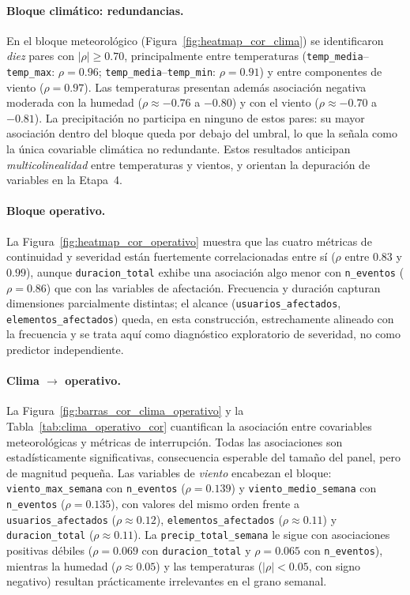     \paragraph{Bloque climático: redundancias.} En el bloque meteorológico (Figura~\ref{fig:heatmap_cor_clima}) se identificaron \textit{diez} pares con $|\rho| \geq 0{.}70$, principalmente entre temperaturas (\texttt{temp\_media}--\texttt{temp\_max}: $\rho = 0{.}96$; \texttt{temp\_media}--\texttt{temp\_min}: $\rho = 0{.}91$) y entre componentes de viento ($\rho = 0{.}97$). Las temperaturas presentan además asociación negativa moderada con la humedad ($\rho \approx -0{.}76$ a $-0{.}80$) y con el viento ($\rho \approx -0{.}70$ a $-0{.}81$). La precipitación no participa en ninguno de estos pares: su mayor asociación dentro del bloque queda por debajo del umbral, lo que la señala como la única covariable climática no redundante. Estos resultados anticipan \textit{multicolinealidad} entre temperaturas y vientos, y orientan la depuración de variables en la Etapa~4.
    
    
    \paragraph{Bloque operativo.} La Figura~\ref{fig:heatmap_cor_operativo} muestra que las cuatro métricas de continuidad y severidad están fuertemente correlacionadas entre sí ($\rho$ entre $0{.}83$ y $0{.}99$), aunque \texttt{duracion\_total} exhibe una asociación algo menor con \texttt{n\_eventos} ($\rho = 0{.}86$) que con las variables de afectación. Frecuencia y duración capturan dimensiones parcialmente distintas; el alcance (\texttt{usuarios\_afectados}, \texttt{elementos\_afectados}) queda, en esta construcción, estrechamente alineado con la frecuencia y se trata aquí como diagnóstico exploratorio de severidad, no como predictor independiente.
    
    
    \paragraph{Clima $\rightarrow$ operativo.} La Figura~\ref{fig:barras_cor_clima_operativo} y la Tabla~\ref{tab:clima_operativo_cor} cuantifican la asociación entre covariables meteorológicas y métricas de interrupción. Todas las asociaciones son estadísticamente significativas, consecuencia esperable del tamaño del panel, pero de magnitud pequeña. Las variables de \textit{viento} encabezan el bloque: \texttt{viento\_max\_semana} con \texttt{n\_eventos} ($\rho = 0{.}139$) y \texttt{viento\_medio\_semana} con \texttt{n\_eventos} ($\rho = 0{.}135$), con valores del mismo orden frente a \texttt{usuarios\_afectados} ($\rho \approx 0{.}12$), \texttt{elementos\_afectados} ($\rho \approx 0{.}11$) y \texttt{duracion\_total} ($\rho \approx 0{.}11$). La \texttt{precip\_total\_semana} le sigue con asociaciones positivas débiles ($\rho = 0{.}069$ con \texttt{duracion\_total} y $\rho = 0{.}065$ con \texttt{n\_eventos}), mientras la humedad ($\rho \approx 0{.}05$) y las temperaturas ($|\rho| < 0{.}05$, con signo negativo) resultan prácticamente irrelevantes en el grano semanal.

